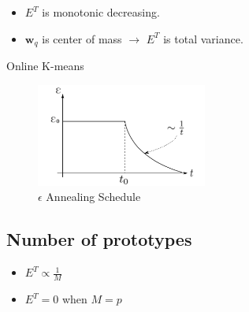 \begin{itemize}
	\item $E^T$ is monotonic decreasing.
	\item $\boldsymbol{w}_q$ is center of mass $\rightarrow$ $E^T$ is total variance.
\end{itemize}

\begin{algorithm}[H]
\caption{Online K-means}
 \KwData{$\epsilon \in [0,1] $}
\end{algorithm}

\begin{figure}[hbt]
	\center
  \includegraphics[width=0.5\textwidth]{figures/cl-annealing-epsilon}
  \caption{$\epsilon$ Annealing Schedule }
  \label{fig:cl-annealing-epsilon}
\end{figure}

\subsection{Number of prototypes}
\begin{itemize}
	\item $E^T \propto \frac{1}{M}$
	\item $E^T = 0$ when $M = p$
\end{itemize}

